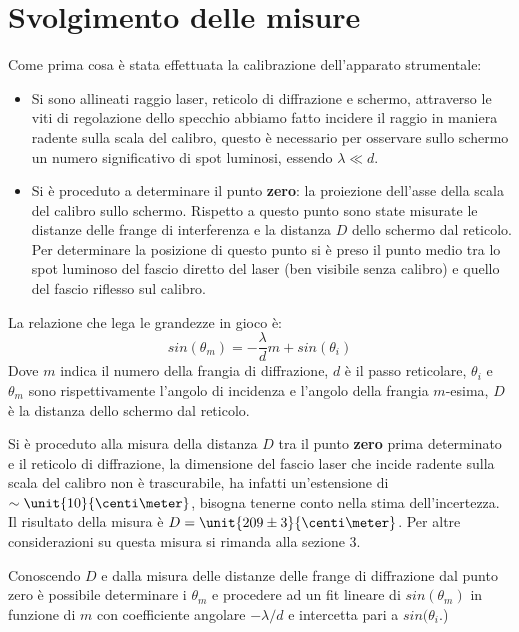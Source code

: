 \section{Svolgimento delle misure}
Come prima cosa è stata effettuata la calibrazione dell'apparato 
strumentale:
\begin{itemize}
	\item Si sono allineati raggio laser, reticolo di diffrazione e schermo, attraverso le viti di regolazione dello specchio abbiamo fatto incidere il raggio in maniera radente sulla scala del calibro, questo è necessario per osservare sullo schermo un numero significativo di spot luminosi, essendo $\lambda \ll d$.
	\item Si è proceduto a determinare il punto \textbf{zero}: la proiezione dell'asse della scala del calibro sullo schermo. Rispetto a questo punto sono state misurate le distanze delle frange di interferenza e la distanza $D$ dello schermo dal reticolo. Per determinare la posizione di questo punto si è preso il punto medio tra lo spot luminoso del fascio diretto del laser (ben visibile senza calibro) e quello del fascio riflesso sul calibro.
\end{itemize}
La relazione che lega le grandezze in gioco è:
$$ sin (\theta_m) =-\frac{\lambda}{d}m+sin (\theta_i)$$
Dove $m$ indica il numero della frangia di diffrazione, $d$ è il passo reticolare, $\theta_i$ e $\theta_m$ sono rispettivamente l'angolo di incidenza e l'angolo della frangia $m$-esima, $D$ è la distanza dello schermo dal reticolo.

Si è proceduto alla misura della distanza $D$ tra il punto \textbf{zero} prima determinato e il reticolo di diffrazione, la dimensione del fascio laser che incide radente sulla scala del calibro non è trascurabile, ha infatti un'estensione di $\sim \unit{10}{\centi\meter}$, bisogna tenerne conto nella stima dell'incertezza. Il risultato della misura è $D = \unit{209 \pm 3}{\centi\meter}$. Per altre considerazioni su questa misura si rimanda alla sezione 3.

Conoscendo $D$ e dalla misura delle distanze delle frange di diffrazione dal punto zero è possibile determinare i $\theta_m$ e procedere ad un fit lineare di $sin(\theta_m)$ in funzione di $m$ con coefficiente angolare $-\lambda/d$ e intercetta pari a $sin(\theta_i$.)

